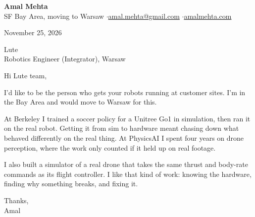 \documentclass[11pt]{article}
\begin{document}
{\LARGE\bfseries Amal Mehta}\\[3pt]
SF Bay Area, moving to Warsaw \quad$\cdot$\quad \href{mailto:amal.mehta@gmail.com}{amal.mehta@gmail.com} \quad$\cdot$\quad \href{https://amalmehta.com/}{amalmehta.com}

\vspace{1.2em}
November 25, 2026

Lute\\
Robotics Engineer (Integrator), Warsaw

\vspace{0.4em}
Hi Lute team,

I’d like to be the person who gets your robots running at customer sites. I’m in the Bay Area and would move to Warsaw for this.

At Berkeley I trained a soccer policy for a Unitree Go1 in simulation, then ran it on the real robot. Getting it from sim to hardware meant chasing down what behaved differently on the real thing. At PhysicsAI I spent four years on drone perception, where the work only counted if it held up on real footage.

I also built a simulator of a real drone that takes the same thrust and body-rate commands as its flight controller. I like that kind of work: knowing the hardware, finding why something breaks, and fixing it.

Thanks,\\
Amal
\end{document}
